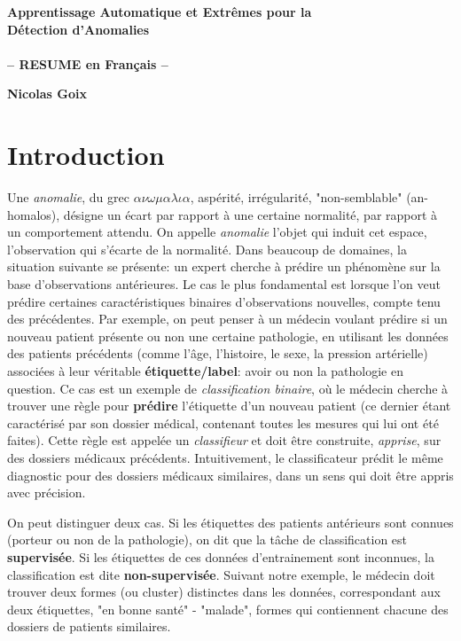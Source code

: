 \documentclass[a4paper, 12pt]{article}
\begin{document}
\begin{center}
{\large \textbf{Apprentissage Automatique et Extrêmes pour la \\ Détection d'Anomalies \\~\\-- RESUME en Français --\\}}
\vspace{1em}

\textbf{Nicolas Goix}
\end{center}


\section{Introduction}
Une \emph{anomalie}, du grec $\alpha \nu \omega \mu \alpha \lambda \iota \alpha $, aspérité, irrégularité, "non-semblable" (an-homalos), désigne un écart par rapport à une certaine normalité, par rapport à un comportement attendu.
On appelle \emph {anomalie} l'objet qui induit cet espace, l'observation qui s'écarte de la normalité.
%
Dans beaucoup de domaines, la situation suivante se présente: un expert cherche à prédire un phénomène sur la base d'observations antérieures. Le cas le plus fondamental est lorsque l'on veut prédire certaines caractéristiques binaires d'observations nouvelles, compte tenu des précédentes. Par exemple, on peut penser à un médecin voulant prédire si un nouveau patient présente ou non une certaine pathologie, en utilisant les données des patients précédents (comme l'âge, l'histoire, le sexe, la pression artérielle) associées à leur véritable \textbf{étiquette/label}: avoir ou non la pathologie en question. Ce cas est un exemple de \emph {classification binaire}, où le médecin cherche à trouver une règle pour \textbf {prédire} l'étiquette d'un nouveau patient (ce dernier étant caractérisé par son dossier médical, contenant toutes les mesures qui lui ont été faites). Cette règle est appelée un \emph{classifieur} et doit être construite, \emph{apprise}, sur des dossiers médicaux précédents. %
Intuitivement, le classificateur prédit le même diagnostic pour des dossiers médicaux similaires, dans un sens qui doit être appris avec précision.

On peut distinguer deux cas. Si les étiquettes des patients antérieurs sont connues (porteur ou non de la pathologie), on dit que la tâche de classification est \textbf {supervisée}. Si les étiquettes de ces données d'entrainement sont inconnues, la classification est dite \textbf {non-supervisée}. Suivant notre exemple, le médecin doit trouver deux formes (ou cluster) distinctes dans les données, correspondant aux deux étiquettes, "en bonne santé" - "malade", formes qui contiennent chacune des dossiers de patients similaires.
\end{document}
